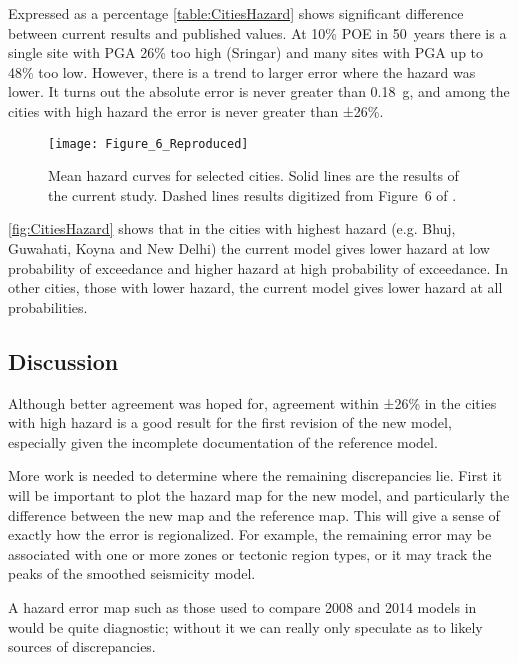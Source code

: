 \documentclass{article}
\begin{document}
Expressed as a percentage \autoref{table:CitiesHazard} shows significant difference between current results and published values. 
At 10\% POE in 50~years there is a single site with PGA 26\% too high (Sringar) and many sites with PGA up to 48\% too low. 
However, there is a trend to larger error where the hazard was lower. 
It turns out the absolute error is never greater than 0.18~g, and among the cities with high hazard the error is never greater than ±26\%.

\begin{figure}
\begin{adjustbox}{center}
\texttt{[image: Figure\_6\_Reproduced]}
\end{adjustbox}
\caption[Mean hazard curves for selected cities]{%
Mean hazard curves for selected cities.
Solid lines are the results of the current study.
Dashed lines results digitized from Figure~6 of \cite{nath2012probabilistic}.}
\label{fig:CitiesHazard}
\end{figure}

\autoref{fig:CitiesHazard} shows that in the cities with highest hazard (e.g. Bhuj, Guwahati, Koyna and New Delhi) the current model gives lower hazard at low probability of exceedance and higher hazard at high probability of exceedance.
In other cities, those with lower hazard, the current model gives lower hazard at all probabilities.

\subsection{Discussion}
\label{subsec:Discussion}

Although better agreement was hoped for, agreement within ±26\% in the cities with high hazard is a good result for the first revision of the new model, especially given the incomplete documentation of the reference model. 

More work is needed to determine where the remaining discrepancies lie.
First it will be important to plot the hazard map for the new model, and particularly the difference between the new map and the reference map.
This will give a sense of exactly how the error is regionalized.
For example, the remaining error may be associated with one or more zones or tectonic region types, or it may track the peaks of the smoothed seismicity model.

A hazard error map such as those used to compare 2008 and 2014 models in \cite{petersen2014documentation} would be quite diagnostic; without it we can really only speculate as to likely sources of discrepancies.
\end{document}
